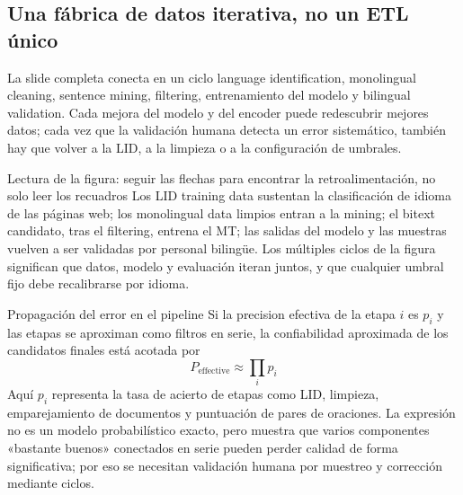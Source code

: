 
\subsection{Una fábrica de datos iterativa, no un ETL único}

La slide completa conecta en un ciclo language identification, monolingual cleaning, sentence mining, filtering, entrenamiento del modelo y bilingual validation. Cada mejora del modelo y del encoder puede redescubrir mejores datos; cada vez que la validación humana detecta un error sistemático, también hay que volver a la LID, a la limpieza o a la configuración de umbrales.


\begin{knowledgebox}{Lectura de la figura: seguir las flechas para encontrar la retroalimentación, no solo leer los recuadros}
Los LID training data sustentan la clasificación de idioma de las páginas web; los monolingual data limpios entran a la mining; el bitext candidato, tras el filtering, entrena el MT; las salidas del modelo y las muestras vuelven a ser validadas por personal bilingüe. Los múltiples ciclos de la figura significan que datos, modelo y evaluación iteran juntos, y que cualquier umbral fijo debe recalibrarse por idioma.
\end{knowledgebox}

\begin{importantbox}{Propagación del error en el pipeline}
Si la precision efectiva de la etapa $i$ es $p_i$ y las etapas se aproximan como filtros en serie, la confiabilidad aproximada de los candidatos finales está acotada por
\[
P_{\text{effective}}\approx\prod_i p_i
\]
Aquí $p_i$ representa la tasa de acierto de etapas como LID, limpieza, emparejamiento de documentos y puntuación de pares de oraciones. La expresión no es un modelo probabilístico exacto, pero muestra que varios componentes «bastante buenos» conectados en serie pueden perder calidad de forma significativa; por eso se necesitan validación humana por muestreo y corrección mediante ciclos.
\end{importantbox}

